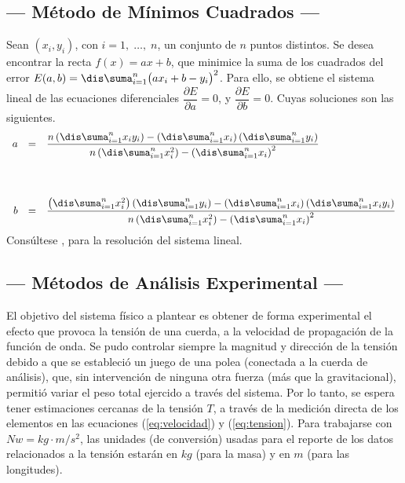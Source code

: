 \documentclass[10pt,a4paper]{article}
\begin{document}
\subsection{--- Método de Mínimos Cuadrados ---} %
Sean \((x_i, y_i)\), con \(i=1, \;\ldots,\; n\), un conjunto de \(n\) puntos distintos.
Se desea encontrar la recta \(f(x) =ax+b\), que minimice la suma de los cuadrados del error \(E(a,b) = \dis\suma_{i=1} ^n \big(ax_i+b -y_i\big) ^2\).
Para ello, se obtiene el sistema lineal de las ecuaciones diferenciales \(\dfrac{\partial E}{\partial a} =0\), y \(\dfrac{\partial E}{\partial b} =0\).
Cuyas soluciones son las siguientes.
\[
	\begin{array}{rcl}
		a&=&\dfrac{n\left(\dis\suma_{i=1}^n x_i y_i\right)-\left(\dis\suma_{i=1}^n x_i \right)\left(\dis\suma_{i=1}^n y_i\right) }{n \left(\dis\suma_{i=1}^n x_i^2\right)-\left(\dis\suma_{i=1}^n x_i\right)^2} \\[1.6cm]
		b&=&\dfrac{\left(\dis\suma_{i=1}^n x_i^2\right)\left(\dis\suma_{i=1}^n y_i\right)-\left(\dis\suma_{i=1}^n x_i \right)\left(\dis\suma_{i=1}^n x_i y_i\right) }{n \left(\dis\suma_{i=1}^n x_i^2\right)-\left(\dis\suma_{i=1}^n x_i\right)^2}
	\end{array}
\]
Consúltese , para la resolución del sistema lineal.

\subsection{--- Métodos de Análisis Experimental ---} %
\label{sub:analisis_exp}
El objetivo del sistema físico a plantear es obtener de forma experimental el efecto que provoca la tensión de una cuerda, a la velocidad de propagación de la función de onda.
Se pudo controlar siempre la magnitud y dirección de la tensión debido a que se estableció un juego de una polea (conectada a la cuerda de análisis), que, sin intervención de ninguna otra fuerza (más que la gravitacional), permitió variar el peso total ejercido a través del sistema.
Por lo tanto, se espera tener estimaciones cercanas de la tensión \(T\), a través de la medición directa de los elementos en las ecuaciones (\ref{eq:velocidad}) y (\ref{eq:tension}).
Para trabajarse con \(Nw=kg \cdot m/s^2\), las unidades (de conversión) usadas para el reporte de los datos relacionados a la tensión estarán en \(kg\) (para la masa) y en \(m\) (para las longitudes).

\end{document}

